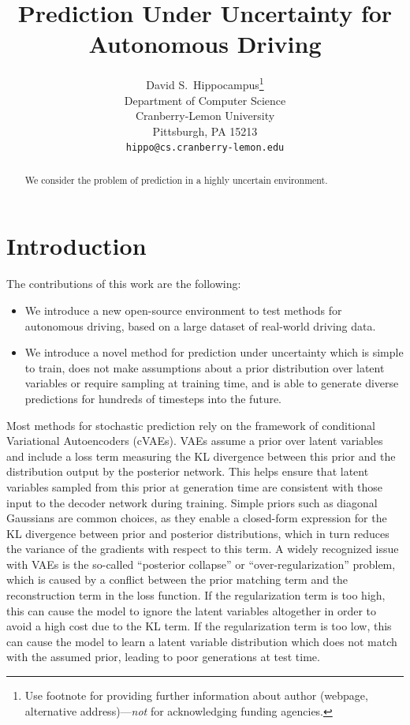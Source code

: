 \documentclass{article}
\title{Prediction Under Uncertainty for Autonomous Driving}
\author{
  David S.~Hippocampus\thanks{Use footnote for providing further
    information about author (webpage, alternative
    address)---\emph{not} for acknowledging funding agencies.} \\
  Department of Computer Science\\
  Cranberry-Lemon University\\
  Pittsburgh, PA 15213 \\
  \texttt{hippo@cs.cranberry-lemon.edu} \\
}
\begin{document}

\maketitle

\begin{abstract}
  We consider the problem of prediction in a highly uncertain environment.
\end{abstract}


\section{Introduction}

The contributions of this work are the following:
\begin{itemize}
\item We introduce a new open-source environment to test methods for autonomous driving, based on a large dataset of real-world driving data.
\item We introduce a novel method for prediction under uncertainty which is simple to train, does not make assumptions about a prior distribution over latent variables or require sampling at training time, and is able to generate diverse predictions for hundreds of timesteps into the future.
\end{itemize}

Most methods for stochastic prediction rely on the framework of conditional Variational Autoencoders (cVAEs).
VAEs assume a prior over latent variables and include a loss term measuring the KL divergence between this prior and the distribution output by the posterior network.
This helps ensure that latent variables sampled from this prior at generation time are consistent with those input to the decoder network during training.
Simple priors such as diagonal Gaussians are common choices, as they enable a closed-form expression for the KL divergence between prior and posterior distributions, which in turn reduces the variance of the gradients with respect to this term.
A widely recognized issue with VAEs is the so-called ``posterior collapse'' or ``over-regularization'' problem, which is caused by a conflict between the prior matching term and the reconstruction term in the loss function. If the regularization term is too high, this can cause the model to ignore the latent variables altogether in order to avoid a high cost due to the KL term. If the regularization term is too low, this can cause the model to learn a latent variable distribution which does not match with the assumed prior, leading to poor generations at test time.
\end{document}

